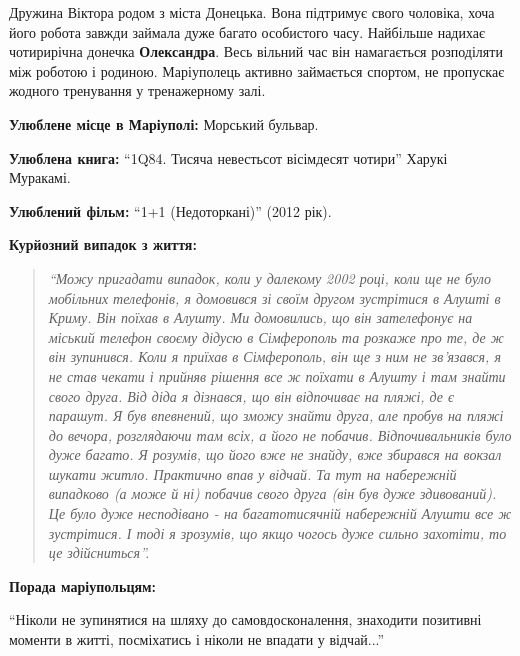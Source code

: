 
Дружина Віктора родом з міста Донецька. Вона підтримує свого чоловіка, хоча
його робота завжди займала дуже багато особистого часу. Найбільше надихає
чотирирічна донечка \textbf{Олександра}. Весь вільний час він намагається
розподіляти між роботою і родиною. Маріуполець активно займається спортом, не
пропускає жодного тренування у тренажерному залі.

\textbf{Улюблене місце в Маріуполі:} Морський бульвар.

\textbf{Улюблена книга:} \enquote{1Q84. Тисяча невестьсот вісімдесят чотири} Харукі Муракамі.

\textbf{Улюблений фільм:} \enquote{1+1 (Недоторкані)} (2012 рік).

\textbf{Курйозний випадок з життя:} 

\begin{quote}
\em\enquote{Можу пригадати випадок, коли у далекому 2002 році, коли ще не було мобільних
телефонів, я домовився зі своїм другом зустрітися в Алушті в Криму. Він
поїхав в Алушту. Ми домовились, що він зателефонує на міський телефон
своєму дідусю в Сімферополь та розкаже про те, де ж він зупинився. Коли
я приїхав в Сімферополь, він ще з ним не зв'язався, я не став чекати і
прийняв рішення все ж поїхати в Алушту і там знайти свого друга. Від
діда я дізнався, що він відпочиває на пляжі, де є парашут. Я був
впевнений, що зможу знайти друга, але пробув на пляжі до вечора,
розглядаючи там всіх, а його не побачив. Відпочивальників було дуже
багато. Я розумів, що його вже не знайду, вже збирався на вокзал шукати
житло. Практично впав у відчай. Та тут на набережній випадково (а може
й ні) побачив свого друга (він був дуже здивований). Це було дуже
несподівано - на багатотисячній набережній Алушти все ж зустрітися. І
тоді я зрозумів, що якщо чогось дуже сильно захотіти, то це
здійсниться}. 
\end{quote}


\textbf{Порада маріупольцям:} 

\enquote{Ніколи не зупинятися на шляху до самовдосконалення, знаходити позитивні
моменти в житті, посміхатись і ніколи не впадати у відчай...}

